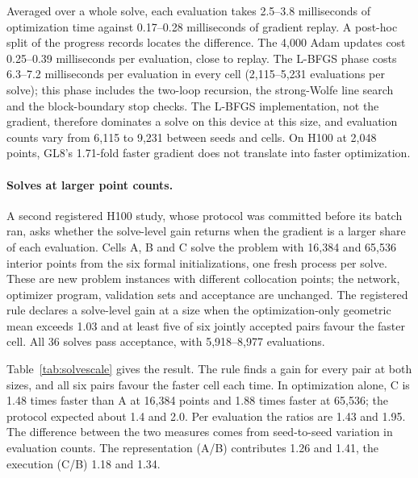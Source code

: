\documentclass[11pt]{article}
\begin{document}
Averaged over a whole solve, each evaluation takes 2.5--3.8 milliseconds
of optimization time against 0.17--0.28 milliseconds of gradient replay.
A post-hoc split of the progress records locates the difference. The 4,000
Adam updates cost 0.25--0.39 milliseconds per evaluation, close to replay.
The L-BFGS phase costs 6.3--7.2 milliseconds per evaluation in every cell
(2,115--5,231 evaluations per solve); this phase includes the two-loop
recursion, the strong-Wolfe line search and the block-boundary stop checks.
The L-BFGS implementation, not the gradient, therefore dominates a solve on
this device at this size, and evaluation counts vary from 6,115 to 9,231
between seeds and cells. On
H100 at 2,048 points, GL8's 1.71-fold faster gradient does not translate
into faster optimization.

\paragraph{Solves at larger point counts.}
A second registered H100 study, whose protocol was committed before its
batch ran, asks whether the solve-level gain returns when the gradient is a
larger share of each evaluation. Cells A, B and C solve the problem with
16,384 and 65,536 interior points from the six formal initializations, one
fresh process per solve. These are new problem instances with different
collocation points; the network, optimizer program, validation sets and
acceptance are unchanged. The registered rule declares a solve-level gain
at a size when the optimization-only geometric mean exceeds 1.03 and at
least five of six jointly accepted pairs favour the faster cell. All 36
solves pass acceptance, with 5,918--8,977 evaluations.

Table~\ref{tab:solvescale} gives the result. The rule finds a gain for
every pair at both sizes, and all six pairs favour the faster cell each
time. In optimization alone, C is 1.48 times faster than A at 16,384
points and 1.88 times faster at 65,536; the protocol expected about 1.4
and 2.0. Per evaluation the ratios are 1.43 and 1.95. The difference
between the two measures comes from seed-to-seed variation in evaluation
counts. The representation (A/B) contributes 1.26 and 1.41, the execution
(C/B) 1.18 and 1.34.
\end{document}
